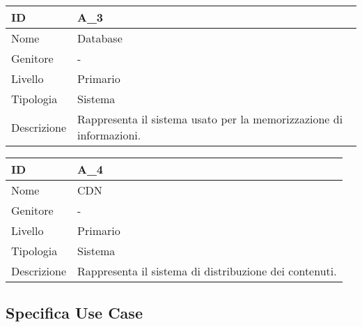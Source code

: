 \begin{center}
\begin{tabular}{ |p{2cm}|p{10cm}|  }
\hline
ID & A\_3 \\\hline
Nome & Database\\\hline
Genitore & - \\\hline
Livello &  Primario \\\hline
Tipologia & Sistema \\\hline
Descrizione &  Rappresenta il sistema usato per la memorizzazione di informazioni. \\\hline
\end{tabular}
\label{table_attore:1}\newline

\begin{tabular}{ |p{2cm}|p{10cm}|  }
\hline
ID & A\_4 \\\hline
Nome & CDN\\\hline
Genitore & - \\\hline
Livello &  Primario \\\hline
Tipologia & Sistema \\\hline
Descrizione &  Rappresenta il sistema di distribuzione dei contenuti. \\\hline
\end{tabular}
\label{table_attore:1}\newline

\end{center}

\subsection{Specifica Use Case}

